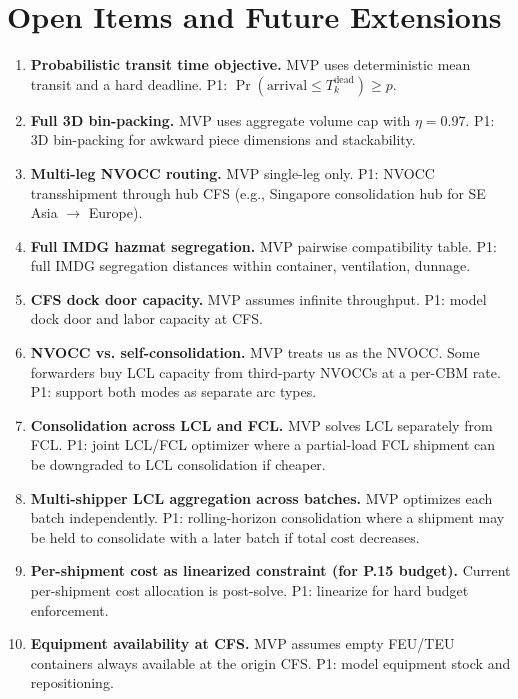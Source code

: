 \documentclass[11pt,a4paper]{article}
\theoremstyle{definition}
\begin{document}
\section{Open Items and Future Extensions}

\begin{enumerate}
  \item \textbf{Probabilistic transit time objective.} MVP uses deterministic mean transit
        and a hard deadline. P1: $\Pr(\text{arrival} \leq T_k^{\text{dead}}) \geq p$.
  \item \textbf{Full 3D bin-packing.} MVP uses aggregate volume cap with $\eta = 0.97$.
        P1: 3D bin-packing for awkward piece dimensions and stackability.
  \item \textbf{Multi-leg NVOCC routing.} MVP single-leg only. P1: NVOCC transshipment
        through hub CFS (e.g., Singapore consolidation hub for SE Asia $\to$ Europe).
  \item \textbf{Full IMDG hazmat segregation.} MVP pairwise compatibility table.
        P1: full IMDG segregation distances within container, ventilation, dunnage.
  \item \textbf{CFS dock door capacity.} MVP assumes infinite throughput. P1: model dock
        door and labor capacity at CFS.
  \item \textbf{NVOCC vs. self-consolidation.} MVP treats us as the NVOCC. Some forwarders
        buy LCL capacity from third-party NVOCCs at a per-CBM rate. P1: support both modes
        as separate arc types.
  \item \textbf{Consolidation across LCL and FCL.} MVP solves LCL separately from FCL.
        P1: joint LCL/FCL optimizer where a partial-load FCL shipment can be downgraded to
        LCL consolidation if cheaper.
  \item \textbf{Multi-shipper LCL aggregation across batches.} MVP optimizes each batch
        independently. P1: rolling-horizon consolidation where a shipment may be held to
        consolidate with a later batch if total cost decreases.
  \item \textbf{Per-shipment cost as linearized constraint (for P.15 budget).}
        Current per-shipment cost allocation is post-solve. P1: linearize for hard budget
        enforcement.
  \item \textbf{Equipment availability at CFS.} MVP assumes empty FEU/TEU containers
        always available at the origin CFS. P1: model equipment stock and repositioning.
\end{enumerate}
\end{document}
